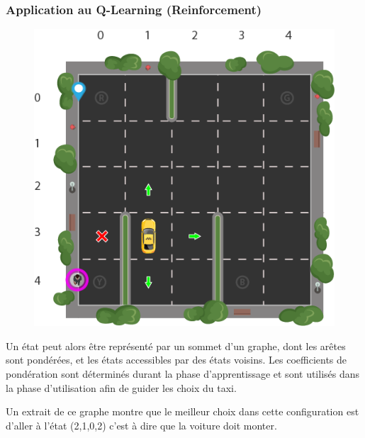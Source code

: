 \begin{frame}[fragile]
\frametitle{Application au Q-Learning (Reinforcement)}

\begin{figure}
\vspace{-1cm}
  \begin{center}
    \includegraphics[width=0.9\linewidth]{img/qlearning}
  \end{center}
\end{figure}

Un état peut alors être représenté par un sommet d'un graphe, dont les arêtes sont pondérées, et les états accessibles par des états voisins. Les coefficients de pondération sont déterminés durant la phase d'apprentissage et sont utilisés dans la phase d'utilisation afin de guider les choix du taxi.

\begin{minipage}{0.35\linewidth}
\end{minipage}\hfill
\begin{minipage}{0.6\linewidth}
Un extrait de ce graphe montre que le meilleur choix dans cette configuration est d'aller à l'état (2,1,0,2) c'est à dire que la voiture doit monter.
\end{minipage}


\end{frame}
